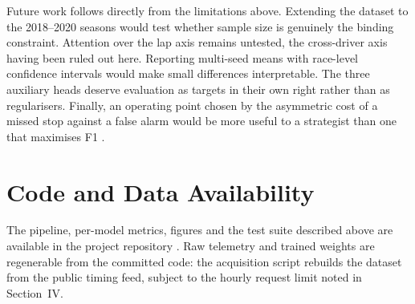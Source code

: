 \documentclass[conference]{IEEEtran}
\begin{document}
Future work follows directly from the limitations above. Extending the dataset to the 2018--2020 seasons would test whether sample size is genuinely the binding constraint. Attention over the lap axis remains untested, the cross-driver axis having been ruled out here. Reporting multi-seed means with race-level confidence intervals would make small differences interpretable. The three auxiliary heads deserve evaluation as targets in their own right rather than as regularisers. Finally, an operating point chosen by the asymmetric cost of a missed stop against a false alarm would be more useful to a strategist than one that maximises F1 \cite{he2009imbalanced}.

\section*{Code and Data Availability}

The pipeline, per-model metrics, figures and the test suite described above are available in the project repository \cite{f1vre2026repo}. Raw telemetry and trained weights are regenerable from the committed code: the acquisition script rebuilds the dataset from the public timing feed, subject to the hourly request limit noted in Section~IV.



\end{document}
